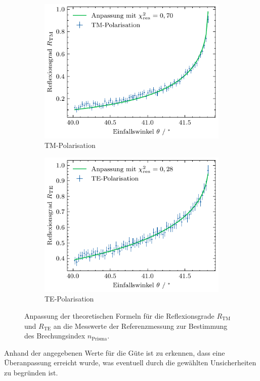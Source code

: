 \begin{figure}[H]
    \centering
    \begin{subfigure}{0.45\textwidth}
        \centering
        \includegraphics[width=\linewidth]{../figs/glas_ppol_fit}
        \caption{TM-Polarisation}
    \end{subfigure}
    \begin{subfigure}{0.45\textwidth}
        \centering
        \includegraphics[width=\linewidth]{../figs/glas_spol_fit}
        \caption{TE-Polarisation}
    \end{subfigure}
    \caption{Anpassung der theoretischen Formeln für die Reflexionsgrade $R_{\mathrm{TM}}$ und $R_{\mathrm{TE}}$ an die Messwerte der Referenzmessung
    zur Bestimmung des Brechungsindex $n_{\mathrm{Prisma}}$.}\label{fig:glas_fit}
\end{figure} Anhand der angegebenen Werte für die Güte ist zu erkennen, dass eine Überanpassung erreicht wurde, was eventuell durch die gewählten Unsicherheiten
zu begründen ist.